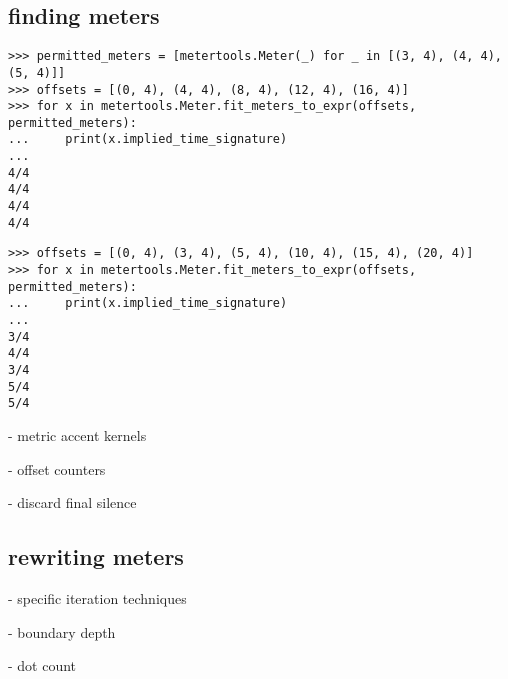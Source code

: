 \subsection{finding meters}

\begin{comment}
<abjad>
permitted_meters = [metertools.Meter(_) for _ in [(3, 4), (4, 4), (5, 4)]]
offsets = [(0, 4), (4, 4), (8, 4), (12, 4), (16, 4)]
for x in metertools.Meter.fit_meters_to_expr(offsets, permitted_meters):
    print(x.implied_time_signature)

</abjad>
\end{comment}

\begin{singlespacing}
\begin{lstlisting}
>>> permitted_meters = [metertools.Meter(_) for _ in [(3, 4), (4, 4), (5, 4)]]
>>> offsets = [(0, 4), (4, 4), (8, 4), (12, 4), (16, 4)]
>>> for x in metertools.Meter.fit_meters_to_expr(offsets, permitted_meters):
...     print(x.implied_time_signature)
...
4/4
4/4
4/4
4/4
\end{lstlisting}
\end{singlespacing}

\begin{comment}
<abjad>
offsets = [(0, 4), (3, 4), (5, 4), (10, 4), (15, 4), (20, 4)]
for x in metertools.Meter.fit_meters_to_expr(offsets, permitted_meters):
    print(x.implied_time_signature)

</abjad>
\end{comment}

\begin{singlespacing}
\begin{lstlisting}
>>> offsets = [(0, 4), (3, 4), (5, 4), (10, 4), (15, 4), (20, 4)]
>>> for x in metertools.Meter.fit_meters_to_expr(offsets, permitted_meters):
...     print(x.implied_time_signature)
...
3/4
4/4
3/4
5/4
5/4
\end{lstlisting}
\end{singlespacing}

- metric accent kernels

- offset counters

- discard final silence

\subsection{rewriting meters}

- specific iteration techniques

- boundary depth

- dot count